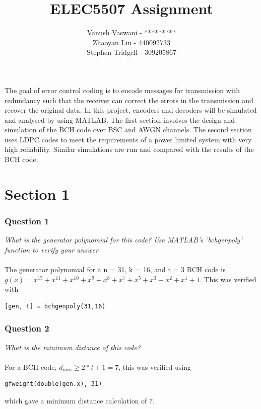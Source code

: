 \documentclass[a4paper]{article}
\begin{document}
\title{ELEC5507 Assignment}
\author{Vanush Vaswani - ********* \\
Zhaoyan Liu - 440092733 \\
Stephen Tridgell - 309205867}

\maketitle


\lstset{language=Matlab}

The goal of error control coding is to encode messages for transmission with redundancy such that the receiver can correct the errors in the transmission and recover the original data. In this project, encoders and decoders will be simulated and analysed by using MATLAB. The first section involves the design and simulation of the BCH code over BSC and AWGN channels. The second section uses LDPC codes to meet the requirements of a power limited system with very high reliability. Similar simulations are run and compared with the results of the BCH code.

\section*{Section 1}

\subsubsection*{Question 1} \textit{What is the generator polynomial for this code? Use MATLAB’s ’bchgenpoly’ function to verify your answer} \\
\\
The generator polynomial for a n = 31, k = 16, and t = 3 BCH code is $g(x) = x^{15} + x^{11} + 
x^{10} + x^{9} + x^{8} + x^{7} + x^{5} + x^{3} + x^{2} + x^{1} + 1$. 
This was verified with 
\begin{lstlisting}
[gen, t] = bchgenpoly(31,16)
\end{lstlisting}

\subsubsection*{Question 2} \textit{What is the minimum distance of this code?} \\
\\
For a BCH code, $d_{min} \geq 2*t + 1 = 7$, this was verified using 
\begin{lstlisting}
gfweight(double(gen.x), 31)
\end{lstlisting}
which gave a minimum distance calculation of 7.
\end{document}
